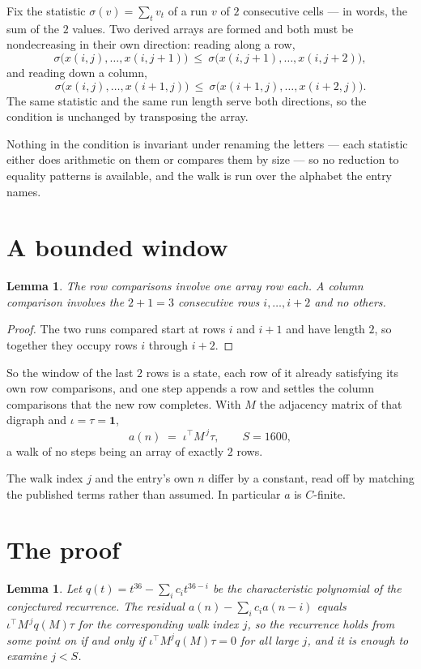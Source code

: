 \documentclass[11pt,a4paper]{article}
\theoremstyle{plain}
\newtheorem{lemma}[theorem]{Lemma}
\theoremstyle{definition}
\begin{document}
Fix the statistic $\sigma(v)=\sum_{t} v_t$ of a run $v$ of $2$ consecutive cells --- in words,
the sum of the $2$ values. Two derived arrays are formed and both must be
nondecreasing in their own direction: reading along a row,
\[
\sigma\bigl(x(i,j),\dots,x(i,j{+}1)\bigr)\ \le\
\sigma\bigl(x(i,j{+}1),\dots,x(i,j{+}2)\bigr),
\]
and reading down a column,
\[
\sigma\bigl(x(i,j),\dots,x(i{+}1,j)\bigr)\ \le\
\sigma\bigl(x(i{+}1,j),\dots,x(i{+}2,j)\bigr).
\]
The same statistic and the same run length serve both directions, so the condition is
unchanged by transposing the array.

Nothing in the condition is invariant under renaming the letters --- each statistic either does
arithmetic on them or compares them by size --- so no reduction to equality patterns is
available, and the walk is run over the alphabet the entry names.

\section{A bounded window}

\begin{lemma}\label{lem:win}
The row comparisons involve one array row each. A column comparison involves the
$2+1=3$ consecutive rows $i,\dots,i{+}2$ and no others.
\end{lemma}

\begin{proof}
The two runs compared start at rows $i$ and $i+1$ and have length $2$, so together they
occupy rows $i$ through $i+2$.
\end{proof}

So the window of the last $2$ rows is a state, each row of it already satisfying its own row
comparisons, and one step appends a row and settles the column comparisons that the new row
completes. With $M$ the adjacency matrix of that digraph and $\iota=\tau=\mathbf{1}$,
\[
a(n)\;=\;\iota^{\!\top}M^{\,j}\tau ,\qquad S=1600,
\]
a walk of no steps being an array of exactly $2$ rows.

The walk index $j$ and the entry's own $n$ differ by a constant, read off by matching the
published terms rather than assumed. In particular $a$ is $C$-finite.

\section{The proof}

\begin{lemma}\label{lem:crit}
Let $q(t)=t^{36}-\sum_i c_it^{36-i}$ be the characteristic polynomial of the
conjectured recurrence. The residual $a(n)-\sum_ic_ia(n-i)$ equals
$\iota^{\!\top}M^{\,j}q(M)\tau$ for the corresponding walk index $j$, so the recurrence
holds from some point on if and only if $\iota^{\!\top}M^{j}q(M)\tau=0$ for all large $j$,
and it is enough to examine $j<S$.
\end{lemma}
\end{document}
